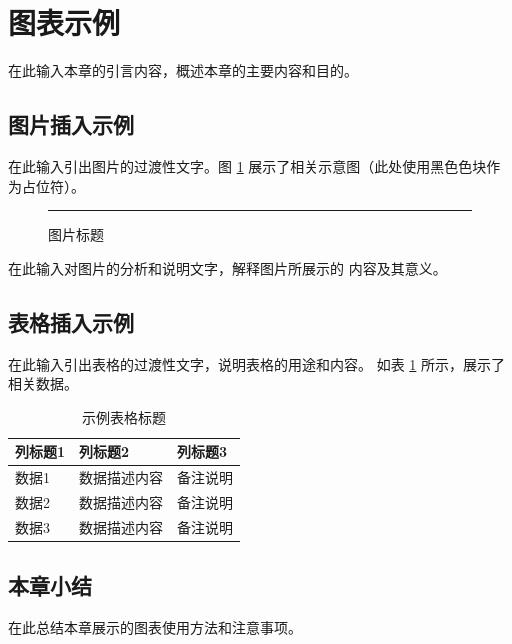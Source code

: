 
\section{图表示例}

在此输入本章的引言内容，概述本章的主要内容和目的。

\subsection{图片插入示例}

在此输入引出图片的过渡性文字。图 \ref{fig:example_fig} 
展示了相关示意图（此处使用黑色色块作为占位符）。

\begin{figure}[H]
    \centering
    \rule{0.6\linewidth}{5cm}
    \caption{图片标题}
    \label{fig:example_fig}
\end{figure}

在此输入对图片的分析和说明文字，解释图片所展示的
内容及其意义。

\subsection{表格插入示例}

在此输入引出表格的过渡性文字，说明表格的用途和内容。
如表 \ref{tab:chapter3_table} 所示，展示了相关数据。

\begin{table}[H]
    \centering
    \caption{示例表格标题}
    \label{tab:chapter3_table}
    \begin{tabularx}{0.95\textwidth}{l X X}
        \toprule
        列标题1 & 列标题2 & 列标题3 \\
        \midrule
        数据1 & 数据描述内容 & 备注说明 \\
        数据2 & 数据描述内容 & 备注说明 \\
        数据3 & 数据描述内容 & 备注说明 \\
        \bottomrule
    \end{tabularx}
\end{table}

\subsection{本章小结}

在此总结本章展示的图表使用方法和注意事项。
